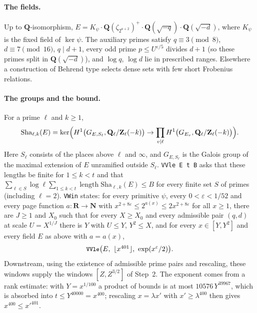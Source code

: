 \documentclass[11pt]{article}
\newcommand{\Lean}[1]{\texttt{\small #1}}
\newcommand{\Q}{\mathbf{Q}}
\newcommand{\Z}{\mathbf{Z}}
\newcommand{\Sha}{\mathrm{Sha}}
\begin{document}
\paragraph{The fields.} Up to $\Q$-isomorphism, $E=K_\psi\cdot\Q(\zeta_{2^{a+2}})^+\cdot\Q(\sqrt{-q})\cdot\Q(\sqrt{-d})$, where $K_\psi$ is the fixed field of $\ker\psi$. The auxiliary primes satisfy $q\equiv3\pmod 8$, $d\equiv7\pmod{16}$, $q\mid d+1$, every odd prime $p\le U^{\varepsilon/5}$ divides $d+1$ (so these primes split in $\Q(\sqrt{-d})$), and $\log q$, $\log d$ lie in prescribed ranges. Elsewhere a construction of Behrend type \cite{behrend} selects dense sets with few short Frobenius relations.

\paragraph{The groups and the bound.} For a prime $\ell$ and $k\ge1$,
\[
\Sha_{\ell,k}(E)=\ker\Bigl(H^1\bigl(G_{E,S_\ell},\Q_\ell/\Z_\ell(-k)\bigr)\to\prod_{v\mid\ell}H^1\bigl(G_{E_v},\Q_\ell/\Z_\ell(-k)\bigr)\Bigr).
\]
Here $S_\ell$ consists of the places above $\ell$ and $\infty$, and $G_{E,S_\ell}$ is the Galois group of the maximal extension of $E$ unramified outside $S_\ell$. \Lean{VVle E t B} asks that these lengths be finite for $1\le k<t$ and that $\sum_{\ell\in S}\log\ell\sum_{1\le k<t}\operatorname{length}\Sha_{\ell,k}(E)\le B$ for every finite set $S$ of primes (including $\ell=2$). \Lean{VWin} states: for every primitive $\psi$, every $0<\varepsilon<1/52$ and every page function $a:\mathbf R\to\mathbf N$ with $x^{2+8\varepsilon}\le2^{a(x)}\le2x^{2+8\varepsilon}$ for all $x\ge1$, there are $J\ge1$ and $X_0$ such that for every $X\ge X_0$ and every admissible pair $(q,d)$ at scale $U=X^{1/J}$ there is $Y$ with $U\le Y$, $Y^2\le X$, and for every $x\in[Y,Y^2]$ and every field $E$ as above with $a=a(x)$,
\[
\textstyle\text{\Lean{VVle}}\bigl(E,\ \lfloor x^{401}\rfloor,\ \exp(x^{\varepsilon}/2)\bigr).
\]
Downstream, using the existence of admissible prime pairs and rescaling, these windows supply the windows $[Z,Z^{3/2}]$ of Step~2. The exponent comes from a rank estimate: with $Y=x^{1/100}$ a product of bounds is at most $10576\,Y^{39967}$, which is absorbed into $t\le Y^{40000}=x^{400}$; rescaling $x=\lambda x'$ with $x'\ge\lambda^{400}$ then gives $x^{400}\le x'^{401}$.
\end{document}
